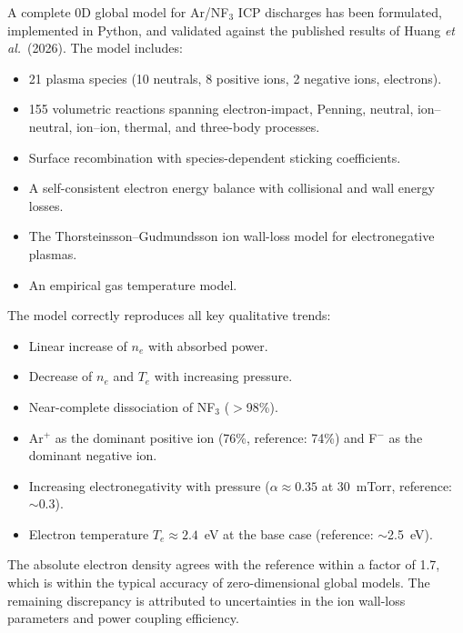 \documentclass[11pt,a4paper]{article}
\newcommand{\Te}{\ensuremath{T_e}}
\renewcommand{\ne}{\ensuremath{n_e}}
\begin{document}
A complete 0D global model for Ar/NF$_3$ ICP discharges has been formulated,
implemented in Python, and validated against the published results of Huang
\textit{et al.}\ (2026). The model includes:

\begin{itemize}[nosep]
  \item 21 plasma species (10 neutrals, 8 positive ions, 2 negative ions, electrons).
  \item 155 volumetric reactions spanning electron-impact, Penning, neutral,
    ion--neutral, ion--ion, thermal, and three-body processes.
  \item Surface recombination with species-dependent sticking coefficients.
  \item A self-consistent electron energy balance with collisional and wall
    energy losses.
  \item The Thorsteinsson--Gudmundsson ion wall-loss model for electronegative
    plasmas.
  \item An empirical gas temperature model.
\end{itemize}

The model correctly reproduces all key qualitative trends:
\begin{itemize}[nosep]
  \item Linear increase of $\ne$ with absorbed power.
  \item Decrease of $\ne$ and $\Te$ with increasing pressure.
  \item Near-complete dissociation of NF$_3$ ($>$98\%).
  \item Ar$^+$ as the dominant positive ion (76\%, reference: 74\%) and F$^-$ as
    the dominant negative ion.
  \item Increasing electronegativity with pressure ($\alpha \approx 0.35$ at
    30~mTorr, reference: $\sim$0.3).
  \item Electron temperature $\Te \approx 2.4$~eV at the base case (reference:
    $\sim$2.5~eV).
\end{itemize}

The absolute electron density agrees with the reference within a factor of 1.7,
which is within the typical accuracy of zero-dimensional global models.
The remaining discrepancy is attributed to uncertainties in the ion wall-loss
parameters and power coupling efficiency.


\appendix
\end{document}
